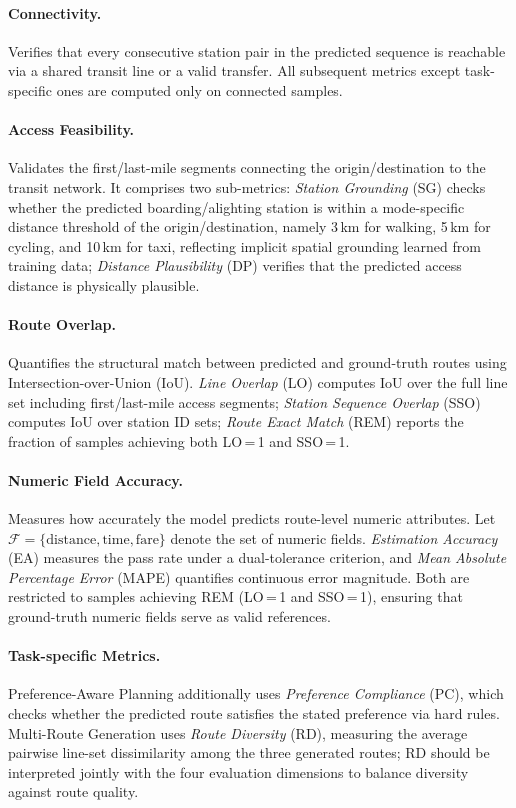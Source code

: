 \documentclass{llmxive}
\begin{document}
\paragraph{Connectivity.} Verifies that every consecutive station pair in the predicted sequence is reachable via a shared transit line or a valid transfer. All subsequent metrics except task-specific ones are computed only on connected samples.
\paragraph{Access Feasibility.} Validates the first/last-mile segments connecting the origin/destination to the transit network. It comprises two sub-metrics: \textit{Station Grounding} (SG) checks whether the predicted boarding/alighting station is within a mode-specific distance threshold of the origin/destination, namely 3\,km for walking, 5\,km for cycling, and 10\,km for taxi, reflecting implicit spatial grounding \cite{li2023geolm} learned from training data; \textit{Distance Plausibility} (DP) verifies that the predicted access distance is physically plausible.
\paragraph{Route Overlap.} Quantifies the structural match between predicted and ground-truth routes using Intersection-over-Union (IoU). \textit{Line Overlap} (LO) computes IoU over the full line set including first/last-mile access segments; \textit{Station Sequence Overlap} (SSO) computes IoU over station ID sets; \textit{Route Exact Match} (REM) reports the fraction of samples achieving both LO\,=\,1 and SSO\,=\,1.
\paragraph{Numeric Field Accuracy.} Measures how accurately the model predicts route-level numeric attributes. Let $\mathcal{F} = \{\text{distance}, \text{time}, \text{fare}\}$ denote the set of numeric fields. \textit{Estimation Accuracy} (EA) measures the pass rate under a dual-tolerance criterion, and \textit{Mean Absolute Percentage Error} (MAPE) quantifies continuous error magnitude. Both are restricted to samples achieving REM (LO\,=\,1 and SSO\,=\,1), ensuring that ground-truth numeric fields serve as valid references.
\paragraph{Task-specific Metrics.} Preference-Aware Planning additionally uses \textit{Preference Compliance} (PC), which checks whether the predicted route satisfies the stated preference via hard rules. Multi-Route Generation uses \textit{Route Diversity} (RD), measuring the average pairwise line-set dissimilarity among the three generated routes; RD should be interpreted jointly with the four evaluation dimensions to balance diversity against route quality.
\endgroup
\end{document}
